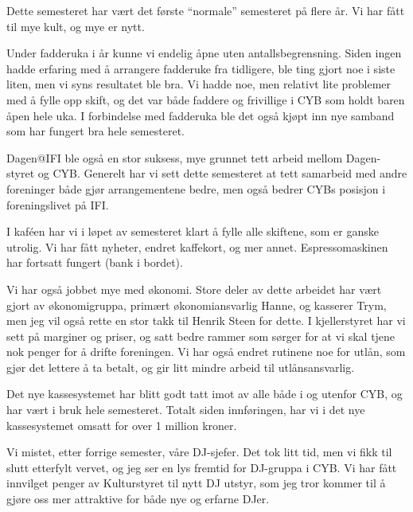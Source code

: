 \documentclass[10pt,norsk,a4paper,usenames,dvipsnames]{article}
\begin{document}
        \begin{multicols}{2}


            Dette semesteret har vært det første “normale” semesteret på flere år. Vi har fått til mye kult, og
            mye er nytt.

            Under fadderuka i år kunne vi endelig åpne uten antallsbegrensning. Siden ingen hadde
            erfaring med å arrangere fadderuke fra tidligere, ble ting gjort noe i siste liten, men vi syns
            resultatet ble bra. Vi hadde noe, men relativt lite problemer med å fylle opp skift, og det var både
            faddere og frivillige i CYB som holdt baren åpen hele uka. I forbindelse med fadderuka ble det
            også kjøpt inn nye samband som har fungert bra hele semesteret.

            Dagen@IFI ble også en stor suksess, mye grunnet tett arbeid mellom Dagen-styret og CYB.
            Generelt har vi sett dette semesteret at tett samarbeid med andre foreninger både gjør
            arrangementene bedre, men også bedrer CYBs posisjon i foreningslivet på IFI.

            I kaféen har vi i løpet av semesteret klart å fylle alle skiftene, som er ganske utrolig. Vi har fått
            nyheter, endret kaffekort, og mer annet. Espressomaskinen har fortsatt fungert (bank i bordet).

            Vi har også jobbet mye med økonomi. Store deler av dette arbeidet har vært gjort av
            økonomigruppa, primært økonomiansvarlig Hanne, og kasserer Trym, men jeg vil også rette en
            stor takk til Henrik Steen for dette.
            I kjellerstyret har vi sett på marginer og priser, og satt bedre rammer som sørger for at vi skal
            tjene nok penger for å drifte foreningen.
            Vi har også endret rutinene noe for utlån, som gjør det lettere å ta betalt, og gir litt mindre arbeid
            til utlånsansvarlig.

            Det nye kassesystemet har blitt godt tatt imot av alle både i og utenfor CYB, og har vært i bruk
            hele semesteret. Totalt siden innføringen, har vi i det nye kassesystemet omsatt for over 1
            million kroner.

            Vi mistet, etter forrige semester, våre DJ-sjefer. Det tok litt tid, men vi fikk til slutt etterfylt vervet,
            og jeg ser en lys fremtid for DJ-gruppa i CYB. Vi har fått innvilget penger av Kulturstyret til nytt
            DJ utstyr, som jeg tror kommer til å gjøre oss mer attraktive for både nye og erfarne DJer.


\end{multicols}
\end{document}
